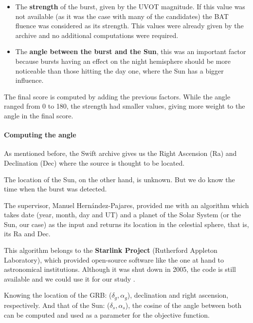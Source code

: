 \begin{itemize}

\item The \textbf{strength} of the burst, given by the UVOT magnitude. If this value was not available (as it was the case with many of the candidates) the BAT fluence was considered as its strength. This values were already given by the archive and no additional computations were required.

\item The \textbf{angle between the burst and the Sun}, this was an important factor because bursts having an effect on the night hemisphere should be more noticeable than those hitting the day one, where the Sun has a bigger influence.

\end{itemize}

The final score is computed by adding the previous factors. While the angle ranged from 0 to 180, the strength had smaller values, giving more weight to the angle in the final score.

\paragraph{Computing the angle}

As mentioned before, the Swift archive gives us the Right Ascension (Ra) and Declination (Dec) where the source is thought to be located.

The location of the Sun, on the other hand, is unknown. But we do know the time when the burst was detected.

The supervisor, Manuel Hernández-Pajares, provided me with an algorithm which takes date (year, month, day and UT) and a planet of the Solar System (or the Sun, our case) as the input and returns its location in the celestial sphere, that is, its Ra and Dec. 

This algorithm belongs to the \textbf{Starlink Project} (Rutherford Appleton Laboratory), which provided open-source software like the one at hand to astronomical institutions. Although it was shut down in 2005, the code is still available and we could use it for our study \cite{starlinkproject}.

Knowing the location of the GRB: ($\delta_{g}, \alpha_{g}$), declination and right ascension, respectively. And that of the Sun: ($\delta_{s}, \alpha_{s}$), the cosine of the angle between both can be computed and used as a parameter for the objective function.

